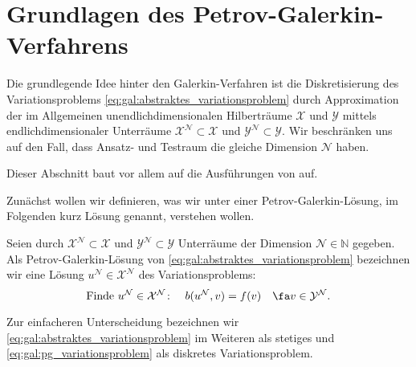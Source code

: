 \section{Grundlagen des Petrov-Galerkin-Verfahrens} %
\label{sub:grb:gv:grundlagen}

Die grundlegende Idee hinter den Galerkin-Verfahren ist die Diskretisierung des Variationsproblems \cref{eq:gal:abstraktes_variationsproblem} durch Approximation der im Allgemeinen unendlichdimensionalen Hilberträume $\mathcal X$ und $\mathcal Y$ mittels endlichdimensionaler Unterräume $\mathcal X^{\mathcal N} \subset \mathcal X$ und $\mathcal Y^{\mathcal N} \subset \mathcal Y$.
Wir beschränken uns auf den Fall, dass Ansatz- und Testraum die gleiche Dimension $\mathcal N$ haben.

Dieser Abschnitt baut vor allem auf die Ausführungen von \textcite[Section 3.1]{Nochetto:2009il} auf.

Zunächst wollen wir definieren, was wir unter einer Petrov-Galerkin-Lösung, im Folgenden kurz Lösung genannt, verstehen wollen.

\begin{Definition}
    \label{def:gal:disrekte_loesung}
    Seien durch $\mathcal X^{\mathcal N} \subset \mathcal X$ und $\mathcal Y^{\mathcal N} \subset \mathcal Y$ Unterräume der Dimension $\mathcal N \in \mathbb{N}$ gegeben.
    Als Petrov-Galerkin-Lösung von \cref{eq:gal:abstraktes_variationsproblem} bezeichnen wir eine Lösung $u^{\mathcal N} \in \mathcal X^{\mathcal N}$ des Variationsproblems:
    \begin{equation}
        \label{eq:gal:pg_variationsproblem}
        \text{Finde}~u^{\mathcal N} \in \mathcal X^{\mathcal N} \colon \quad  b(u^{\mathcal N}, v) = f(v) \quad \fa v \in \mathcal Y^{\mathcal N}.
    \end{equation}
\end{Definition}

Zur einfacheren Unterscheidung bezeichnen wir \cref{eq:gal:abstraktes_variationsproblem} im Weiteren als stetiges und \cref{eq:gal:pg_variationsproblem} als diskretes Variationsproblem.

